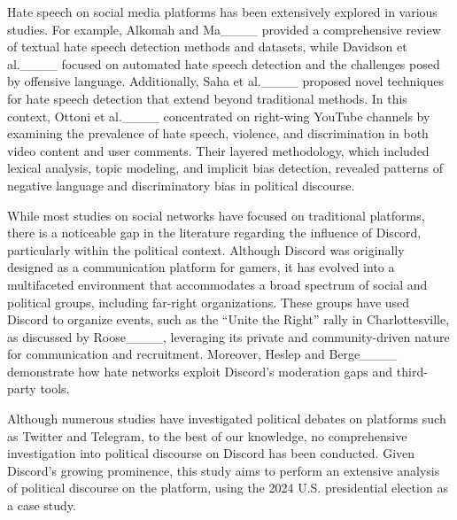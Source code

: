 Hate speech on social media platforms has been extensively explored in various studies. For example, Alkomah and Ma____ provided a comprehensive review of textual hate speech detection methods and datasets, while Davidson et al.____ focused on automated hate speech detection and the challenges posed by offensive language. Additionally, Saha et al.____ proposed novel techniques for hate speech detection that extend beyond traditional methods. In this context, Ottoni et al.____ concentrated on right-wing YouTube channels by examining the prevalence of hate speech, violence, and discrimination in both video content and user comments. Their layered methodology, which included lexical analysis, topic modeling, and implicit bias detection, revealed patterns of negative language and discriminatory bias in political discourse.

While most studies on social networks have focused on traditional platforms, there is a noticeable gap in the literature regarding the influence of Discord, particularly within the political context. Although Discord was originally designed as a communication platform for gamers, it has evolved into a multifaceted environment that accommodates a broad spectrum of social and political groups, including far-right organizations. These groups have used Discord to organize events, such as the ``Unite the Right'' rally in Charlottesville, as discussed by Roose____, leveraging its private and community-driven nature for communication and recruitment. Moreover, Heslep and Berge____ demonstrate how hate networks exploit Discord's moderation gaps and third-party tools.

Although numerous studies have investigated political debates on platforms such as Twitter and Telegram, to the best of our knowledge, no comprehensive investigation into political discourse on Discord has been conducted. Given Discord's growing prominence, this study aims to perform an extensive analysis of political discourse on the platform, using the 2024 U.S. presidential election as a case study.



